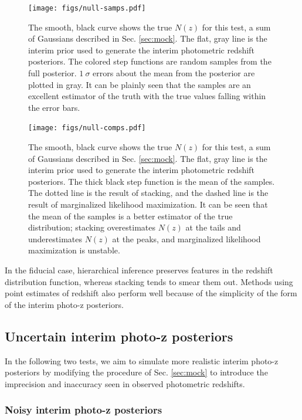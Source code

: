 \documentclass[preprint]{aastex}
\begin{document}
\begin{figure}
\texttt{[image: figs/null-samps.pdf]}
\caption{The smooth, black curve shows the true $N(z)$ for this test, a sum of 
Gaussians described in Sec. \ref{sec:mock}.  The flat, gray line is the interim 
prior used to generate the interim photometric redshift posteriors.  The 
colored step functions are random samples from the full posterior.  $1\ \sigma$ 
errors about the mean from the posterior are plotted in gray.  It can be 
plainly seen that the samples are an excellent estimator of the truth with the 
true values falling within the error bars.}
\label{fig:null-samp}
\end{figure}

\begin{figure}
\texttt{[image: figs/null-comps.pdf]}
\caption{The smooth, black curve shows the true $N(z)$ for this test, a sum of 
Gaussians described in Sec. \ref{sec:mock}.  The flat, gray line is the interim 
prior used to generate the interim photometric redshift posteriors.  The thick 
black step function is the mean of the samples.  The dotted line is the result 
of stacking, and the dashed line is the result of marginalized likelihood 
maximization.  It can be seen that the mean of the samples is a better 
estimator of the true distribution; stacking overestimates $N(z)$ at the tails 
and underestimates $N(z)$ at the peaks, and marginalized likelihood 
maximization is unstable.}
\label{fig:null-comp}
\end{figure}

In the fiducial case, hierarchical inference preserves features in the redshift 
distribution function, whereas stacking tends to smear them out.  Methods using 
point estimates of redshift also perform well because of the simplicity of the 
form of the interim photo-z posteriors.

\clearpage
\subsection{Uncertain interim photo-z posteriors}
\label{sec:unc}

In the following two tests, we aim to simulate more realistic interim photo-z 
posteriors by modifying the procedure of Sec. \ref{sec:mock} to introduce the 
imprecision and inaccuracy seen in observed photometric redshifts.

\subsubsection{Noisy interim photo-z posteriors}
\label{sec:noisy}
\end{document}
